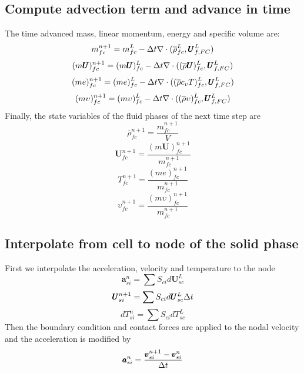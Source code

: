 \documentclass[preprint,12pt]{elsarticle}
\begin{document}
\subsection{\textsf{Compute advection term and advance in time}}
The time advanced mass, linear momentum, energy and specific volume are:
%
%
\begin{equation}
 m_{fc}^{n+1} = m_{fc}^L - \Delta{t}  \nabla \cdot (\overline{\rho}_{fc}^L,\pmb{U}_{f,FC}^{L})
\end {equation}
%
%
\begin{equation}
 (m \pmb{U})_{fc}^{n+1} = (m \pmb{U})_{fc}^L - \Delta{t}  \nabla \cdot ((\overline{\rho} \pmb{U})_{fc}^L,\pmb{U}_{f,FC}^{L})
\end {equation}
%
%
\begin{equation}
 (me)_{fc}^{n+1} = (me)_{fc}^L - \Delta{t}  \nabla \cdot ((\overline{\rho} c_v T)_{fc}^L,\pmb{U}_{f,FC}^{L})
\end {equation}
%
%
\begin{equation}
 (m \upsilon)_{fc}^{n+1} = (m \upsilon)_{fc}^L - \Delta{t}  \nabla \cdot ((\overline{\rho} \upsilon)_{fc}^L,\pmb{U}_{f,FC}^{L})
\end {equation}
%
%
Finally, the state variables of the fluid phases of the next time step are
%
%
\begin{equation}
\overline{\rho}_{fc}^{n+1} = \frac{m_{fc}^{n+1}} {V}
\end {equation}
%
%
\begin{equation}
 \pmb{U}_{fc}^{n+1} = \frac{(m \pmb{U})_{fc}^{n+1}}{m_{fc}^{n+1}} 
\end {equation}
%
%
\begin{equation}
 T_{fc}^{n+1} = \frac{(me)_{fc}^{n+1}}{m_{fc}^{n+1}}
\end {equation}
%
%
\begin{equation}
 \upsilon_{fc}^{n+1} = \frac{(m \upsilon)_{fc}^{n+1}}{m_{fc}^{n+1}}
\end {equation}
%
%
\subsection{\textsf{Interpolate from cell to node of the solid phase}}
%
First we interpolate the acceleration, velocity and temperature to the node
%
%
\begin{equation}
 \pmb{a}_{si}^n = \sum{S_{ci} d\pmb{U}_{sc}^L}
\end {equation}
%
%
\begin{equation}
 \pmb{U}_{si}^{n+1} = \sum{S_{ci} d\pmb{U}_{sc}^L} \Delta{t}
\end {equation}
%
\begin{equation}
 dT_{si}^n =  \sum{S_{ci} dT_{sc}^L}
\end {equation}
%
%
Then the boundary condition and contact forces are applied to the nodal velocity and the acceleration is modified by
%
%
\begin{equation}
     \pmb{a}_{si}^n = \frac{\pmb{v}_{si}^{n+1} - \pmb{v}_{si}^n}{\Delta{t}}
\end {equation}
%
%
\end{document}
